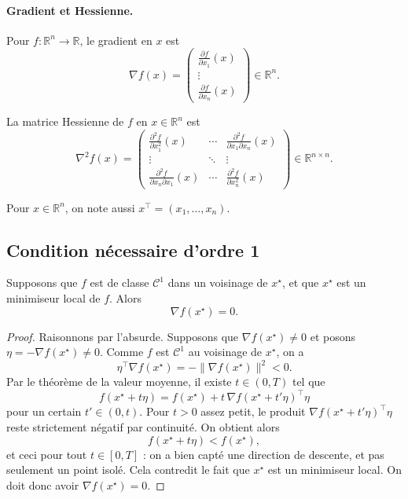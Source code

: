 \paragraph{Gradient et Hessienne.}

Pour $f : \mathbb{R}^n \to \mathbb{R}$, le gradient en $x$ est
\[
\nabla f(x) =
\begin{pmatrix}
\displaystyle \frac{\partial f}{\partial x_1}(x)\\[0.3em]
\vdots\\[0.3em]
\displaystyle \frac{\partial f}{\partial x_n}(x)
\end{pmatrix}
\in \mathbb{R}^n.
\]

La matrice Hessienne de $f$ en $x \in \mathbb{R}^n$ est
\[
\nabla^2 f(x) =
\begin{pmatrix}
\frac{\partial^2 f}{\partial x_1^2}(x) &
\cdots &
\frac{\partial^2 f}{\partial x_1 \partial x_n}(x)\\
\vdots & \ddots & \vdots \\
\frac{\partial^2 f}{\partial x_n \partial x_1}(x) &
\cdots &
\frac{\partial^2 f}{\partial x_n^2}(x)
\end{pmatrix}
\in \mathbb{R}^{n \times n}.
\]

Pour $x \in \mathbb{R}^n$, on note aussi $x^\top = (x_1,\dots,x_n)$.

\subsection{Condition nécessaire d’ordre 1}
\label{subsec:2.2.2}

\begin{theoreme}
\label{thm:first-order}
Supposons que $f$ est de classe $\mathcal{C}^1$ dans un voisinage de $x^\star$, et
que $x^\star$ est un minimiseur local de $f$. Alors
\begin{equation}
    \nabla f(x^\star) = 0.
\end{equation}
\end{theoreme}

\begin{proof}
Raisonnons par l’absurde. Supposons que $\nabla f(x^\star) \neq 0$ et posons
$\eta = -\nabla f(x^\star) \neq 0$. Comme $f$ est $\mathcal{C}^1$ au voisinage de
$x^\star$, on a
\[
    \eta^\top \nabla f(x^\star) = -\|\nabla f(x^\star)\|^2 < 0.
\]
Par le théorème de la valeur moyenne, il existe $t \in (0,T)$ tel que
\[
    f(x^\star + t\eta) = f(x^\star) + t\,\nabla f(x^\star + t'\eta)^\top \eta
\]
pour un certain $t' \in (0,t)$. Pour $t>0$ assez petit, le produit
$\nabla f(x^\star + t'\eta)^\top \eta$ reste strictement négatif par continuité.
On obtient alors
\[
    f(x^\star + t\eta) < f(x^\star),
\]
et ceci pour tout $t \in [0,T]$ : on a bien capté une direction de descente, et pas seulement un point isolé. Cela contredit le fait que $x^\star$ est un minimiseur local. On doit donc avoir
$\nabla f(x^\star) = 0$.
\end{proof}

